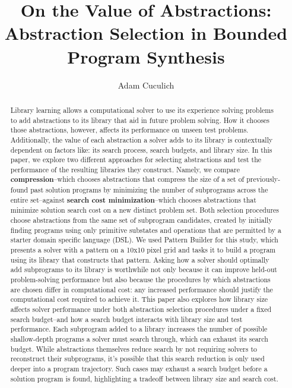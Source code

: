 \documentclass[10pt]{article}
\title{On the Value of Abstractions: Abstraction Selection in Bounded Program Synthesis}
\author{Adam Cuculich}
\begin{document}
\maketitle

\begin{abstract}
Library learning allows a computational solver to use its experience solving problems to add abstractions to its library that aid in future problem solving. How it chooses those abstractions, however, affects its performance on unseen test problems. Additionally, the value of each abstraction a solver adds to its library is contextually dependent on factors like: its search process, search budgets, and library size. In this paper, we explore two different approaches for selecting abstractions and test the performance of the resulting libraries they construct. Namely, we compare \textbf{compression}--which chooses abstractions that compress the size of a set of previously-found past solution programs by minimizing the number of subprograms across the entire set--against \textbf{search cost minimization}--which chooses abstractions that minimize solution search cost on a new distinct problem set. Both selection procedures choose abstractions from the same set of subprogram candidates, created by initially finding programs using only primitive substates and operations that are permitted by a starter domain specific language (DSL). We used Pattern Builder for this study, which presents a solver with a pattern on a 10x10 pixel grid and tasks it to build a program using its library that constructs that pattern. Asking how a solver should optimally add subprograms to its library is worthwhile not only because it can improve held-out problem-solving performance but also because the procedures by which abstractions are chosen differ in computational cost: any increased performance should justify the computational cost required to achieve it. This paper also explores how library size affects solver performance under both abstraction selection procedures under a fixed search budget--and how a search budget interacts with library size and test performance. Each subprogram added to a library increases the number of possible shallow-depth programs a solver must search through, which can exhaust its search budget. While abstractions themselves reduce search by not requiring solvers to reconstruct their subprograms, it's possible that this search reduction is only used deeper into a program trajectory. Such cases may exhaust a search budget before a solution program is found, highlighting a tradeoff between library size and search cost.


\end{abstract}
\end{document}
